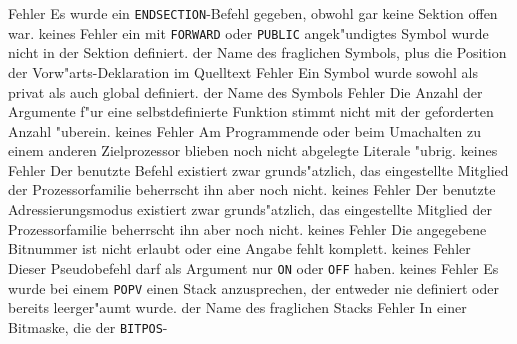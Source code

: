 \documentclass[12pt,a4paper,twoside]{report}
\newcommand{\tty}[1]{{\tt #1}}
\begin{document}
{\begin{description}
               {Fehler}
               {Es wurde ein \tty{ENDSECTION}-Befehl gegeben, obwohl
                gar keine Sektion offen war.}
               {keines}
               {Fehler}
               {ein mit \tty{FORWARD} oder \tty{PUBLIC}
	        angek"undigtes Symbol wurde nicht in der Sektion definiert.}
               {der Name des fraglichen Symbols, plus die
                Position der Vorw"arts-Deklaration im Quelltext}
               {Fehler}
               {Ein Symbol wurde sowohl als privat als auch
                global definiert.}
               {der Name des Symbols}
               {Fehler}
               {Die Anzahl der Argumente f"ur eine
                selbstdefinierte Funktion stimmt nicht mit der geforderten
                Anzahl "uberein.}
               {keines}
               {Fehler}
               {Am Programmende oder beim Umachalten
                zu einem anderen Zielprozessor blieben noch nicht
                abgelegte Literale "ubrig.}
               {keines}
               {Fehler}
               {Der benutzte Befehl existiert zwar
                grunds"atzlich, das eingestellte Mitglied der
                Prozessorfamilie beherrscht ihn aber noch nicht.}
               {keines}
               {Fehler}
               {Der benutzte Adressierungsmodus existiert
                zwar grunds"atzlich, das eingestellte Mitglied der
                Prozessorfamilie beherrscht ihn aber noch nicht.}
               {keines}
               {Fehler}
               {Die angegebene Bitnummer ist nicht erlaubt
	        oder eine Angabe fehlt komplett.}
               {keines}
               {Fehler}
               {Dieser Pseudobefehl darf als Argument nur \tty{ON}
                oder \tty{OFF} haben.}
               {keines}
               {Fehler}
               {Es wurde bei einem \tty{POPV}
                einen Stack anzusprechen, der entweder nie definiert oder
                bereits leerger"aumt wurde.}
               {der Name des fraglichen Stacks}
	       {Fehler}
               {In einer Bitmaske, die der \tty{BITPOS}-
}
\end{description}}
\end{document}

